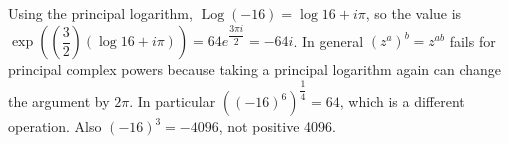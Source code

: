 Using the principal logarithm, $\operatorname{Log}(-16)=\log16+i\pi$, so the value is $\exp((\dfrac{3}{2})(\log16+i\pi))=64e^{\dfrac{3\pi i}{2}}=\boxed{-64i}$. In general $(z^a)^b=z^{ab}$ fails for principal complex powers because taking a principal logarithm again can change the argument by $2\pi$. In particular $((-16)^6)^{\dfrac{1}{4}}=64$, which is a different operation. Also $(-16)^3=-4096$, not positive 4096.
